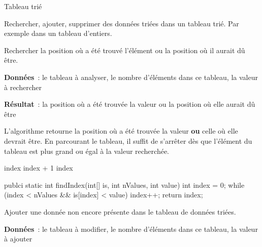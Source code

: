 \begin{Fiche}{Tableau trié}
\label{fiche:tab-recherche-triee}

	
	Rechercher, ajouter, supprimer des données triées dans un tableau trié. Par
	exemple dans un tableau d'entiers. 



	Rechercher la position où a été trouvé l’élément ou la position où il aurait
	dû être.
	
	\textbf{Données}~: le tableau à analyser, le nombre d'éléments dans ce
	tableau, la valeur à rechercher
		
	\textbf{Résultat}~: la position où a été trouvée la valeur ou la position où
	elle aurait dû être


	L'algorithme retourne la position où a été trouvée la valeur \textbf{ou}
	celle où elle devrait être. En parcourant le tableau, il suffit de
	s'arrêter dès que l'élément du tableau est plus grand ou égal à la valeur
	recherchée. 

		\begin{pseudocode}
					 
						\Let index \Gets index + 1
					\EndWhile
					\Return index
				\EndAlgo
		\end{pseudocode}

		\begin{java}
publci static int findIndex(int[] is, int nValues, int value){
	int index = 0;
	while (index < nValues && is[index] < value){
		index++;
	}
	return index;
}
		\end{java}



	
	Ajouter une donnée non encore présente dans le tableau de données triées.
	
	\textbf{Données}~: le tableau à modifier, le nombre d'éléments dans ce
	tableau, la valeur à ajouter
		

\end{Fiche}
